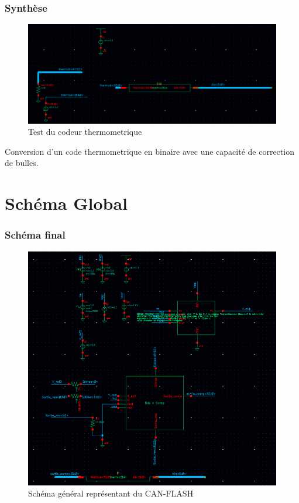 \documentclass{beamer}
\begin{document}
\begin{frame}
\frametitle{Synth\`ese}

\begin{figure}[!htb]
  \includegraphics[width=0.8\linewidth]{test_thermo2bin.png}
  \caption{Test du codeur thermometrique}
\end{figure}

Conversion d'un code thermometrique en binaire avec une capacit\'e de correction
de bulles.

\end{frame}


\section{Sch\'ema Global}

\begin{frame}
\frametitle{Sch\'ema final}

\begin{figure}[!htb]
  \includegraphics[width=0.6\linewidth]{schema_final.png}
  \caption{Sch\'ema g\'en\'eral repr\'esentant du CAN-FLASH}
\end{figure}

\end{frame}

\end{document}
